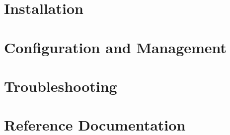 \documentclass[11pt,twoside,final,openright]{report}
\begin{document}
\part{Installation}














\part{Configuration and Management}












\part{Troubleshooting}










\part{Reference Documentation}









\appendix


\end{document}
